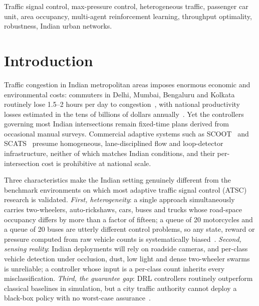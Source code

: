 \documentclass[journal]{IEEEtran}
\begin{document}
\begin{abstract}
and is wrapped in a stability-preserving action filter for which we prove
an explicit queue bound (Corollary~1), giving the learned policy a
certified performance floor. Experiments on SUMO with sublane modelling
of two-wheeler gap-filling span a 5-intersection arterial, a
$4\times4$ grid, and a corridor extracted from OpenStreetMap around
Hoskote--K.\,R.~Puram on Old Madras Road in the Bengaluru Metropolitan
Region, against twelve classical and learned baselines, with a
pre-registered protocol reporting effect sizes and bootstrap confidence
intervals alongside Holm--Bonferroni-corrected Wilcoxon tests. The
complete protocol is designed to run on a single eight-core workstation.
\end{abstract}

\begin{IEEEkeywords}
Traffic signal control, max-pressure control, heterogeneous traffic,
passenger car unit, area occupancy, multi-agent reinforcement learning,
throughput optimality, robustness, Indian urban networks.
\end{IEEEkeywords}

\section{Introduction}
\label{sec:intro}
Traffic congestion in Indian metropolitan areas imposes enormous economic
and environmental costs: commuters in Delhi, Mumbai, Bengaluru and
Kolkata routinely lose 1.5--2 hours per day to congestion~\cite{b_tomtom},
with national productivity losses estimated in the tens of billions of
dollars annually~\cite{b_morth}. Yet the controllers governing most
Indian intersections remain fixed-time plans derived from occasional
manual surveys. Commercial adaptive systems such as SCOOT~\cite{b_scoot}
and SCATS~\cite{b_scats} presume homogeneous, lane-disciplined flow and
loop-detector infrastructure, neither of which matches Indian conditions,
and their per-intersection cost is prohibitive at national scale.

Three characteristics make the Indian setting genuinely different from
the benchmark environments on which most adaptive traffic signal control
(ATSC) research is validated. \emph{First, heterogeneity}: a single
approach simultaneously carries two-wheelers, auto-rickshaws, cars, buses
and trucks whose road-space occupancy differs by more than a factor of
fifteen; a queue of 20 motorcycles and a queue of 20 buses are utterly
different control problems, so any state, reward or pressure computed
from raw vehicle counts is systematically biased~\cite{b_radha,%
b_wang_hetero}. \emph{Second, sensing reality}: Indian deployments will
rely on roadside cameras, and per-class vehicle detection under
occlusion, dust, low light and dense two-wheeler swarms is unreliable; a
controller whose input is a per-class count inherits every
misclassification. \emph{Third, the guarantee gap}: DRL controllers
routinely outperform classical baselines in simulation, but a city
traffic authority cannot deploy a black-box policy with no worst-case
assurance~\cite{b_survey_wei,b_haydari}.
\end{document}
